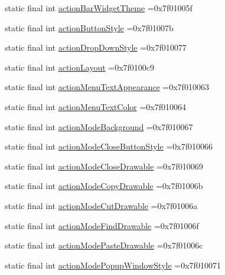 \begin{DoxyCompactItemize}
\item 
static final int \hyperlink{classproject4_1_1xaria_1_1R_1_1attr_a01251e35360b84137e63ab443558df3a}{action\+Bar\+Widget\+Theme} =0x7f01005f
\item 
static final int \hyperlink{classproject4_1_1xaria_1_1R_1_1attr_a81a0368697fe12e9d5526082bbe6191f}{action\+Button\+Style} =0x7f01007b
\item 
static final int \hyperlink{classproject4_1_1xaria_1_1R_1_1attr_aef752dee5688113de68b26f74e585351}{action\+Drop\+Down\+Style} =0x7f010077
\item 
static final int \hyperlink{classproject4_1_1xaria_1_1R_1_1attr_a8f9719d465fb5e9f5366f192ec3e884f}{action\+Layout} =0x7f0100c9
\item 
static final int \hyperlink{classproject4_1_1xaria_1_1R_1_1attr_a2042dc725700b2bfec9ec44ed8af8b0e}{action\+Menu\+Text\+Appearance} =0x7f010063
\item 
static final int \hyperlink{classproject4_1_1xaria_1_1R_1_1attr_a3f2c5d23f0952a747d4e812fbe2b1629}{action\+Menu\+Text\+Color} =0x7f010064
\item 
static final int \hyperlink{classproject4_1_1xaria_1_1R_1_1attr_ac8a7071e16b604cd5ed28ea9eda53dd9}{action\+Mode\+Background} =0x7f010067
\item 
static final int \hyperlink{classproject4_1_1xaria_1_1R_1_1attr_afbbadc301530efdd76096a0842b70605}{action\+Mode\+Close\+Button\+Style} =0x7f010066
\item 
static final int \hyperlink{classproject4_1_1xaria_1_1R_1_1attr_ad271e28eff4cc7a5d48e50f3d6525ac9}{action\+Mode\+Close\+Drawable} =0x7f010069
\item 
static final int \hyperlink{classproject4_1_1xaria_1_1R_1_1attr_a46e49dce7936260f23268beb416e989b}{action\+Mode\+Copy\+Drawable} =0x7f01006b
\item 
static final int \hyperlink{classproject4_1_1xaria_1_1R_1_1attr_a99bc008fe40749347ad6adbb1b62f2f7}{action\+Mode\+Cut\+Drawable} =0x7f01006a
\item 
static final int \hyperlink{classproject4_1_1xaria_1_1R_1_1attr_a6db1f9424a3ef67b80ce5f1c1bb8e046}{action\+Mode\+Find\+Drawable} =0x7f01006f
\item 
static final int \hyperlink{classproject4_1_1xaria_1_1R_1_1attr_a1010ffe659185937b5a32a04a4c51a7c}{action\+Mode\+Paste\+Drawable} =0x7f01006c
\item 
static final int \hyperlink{classproject4_1_1xaria_1_1R_1_1attr_a7b02c646c929a70e91aaefc13fd7eba2}{action\+Mode\+Popup\+Window\+Style} =0x7f010071

\end{DoxyCompactItemize}
